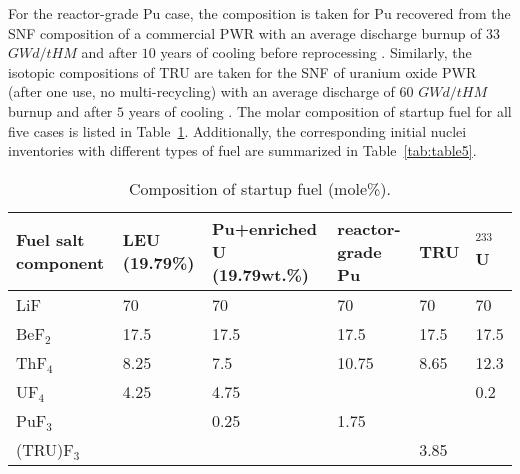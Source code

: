 For the reactor-grade Pu case, the composition is taken for Pu 
recovered from the SNF composition of a commercial \gls{PWR} with an 
average discharge burnup of $33$ $GWd/tHM$ and after $10$ years of cooling before 
reprocessing \cite{oecd1989probabilistic,marka1993explosive}. Similarly, the 
isotopic compositions of \gls{TRU} are taken for the SNF of uranium oxide \gls{PWR} 
(after one use, no multi-recycling) with an average discharge of $60$ 
$GWd/tHM$ burnup and after $5$ years of cooling \cite{de2000scenarios}. 
The molar composition of startup fuel for all five cases is listed in 
Table~\ref{tab:table4}. Additionally, the corresponding initial nuclei 
inventories with different types of fuel are summarized in 
Table~\ref{tab:table5}.
\begin{table}  %
	\caption{Composition of startup fuel (mole\%).}
	\vspace{0.1in}
	\begin{tabularx}{\textwidth}{p{} X p{} 
	p{} X X}
		\hline
		Fuel salt component& \gls{LEU} (19.79\%) & Pu+enriched U (19.79wt.\%) 
		&  reactor-grade Pu & \gls{TRU}& $^{233}$U \\
		\hline
		LiF&70&70&70&70&70\\
		BeF$_2$&17.5&17.5&17.5&17.5&17.5\\
		ThF$_4$&8.25&7.5&10.75&	8.65&12.3		\\
		UF$_4$&4.25&4.75&&&	0.2		\\
		PuF$_3$&&0.25&1.75&&		\\
		(TRU)F$_3$&&&	&3.85	&\\
		\hline
	\end{tabularx}
	\label{tab:table4}
\end{table}

